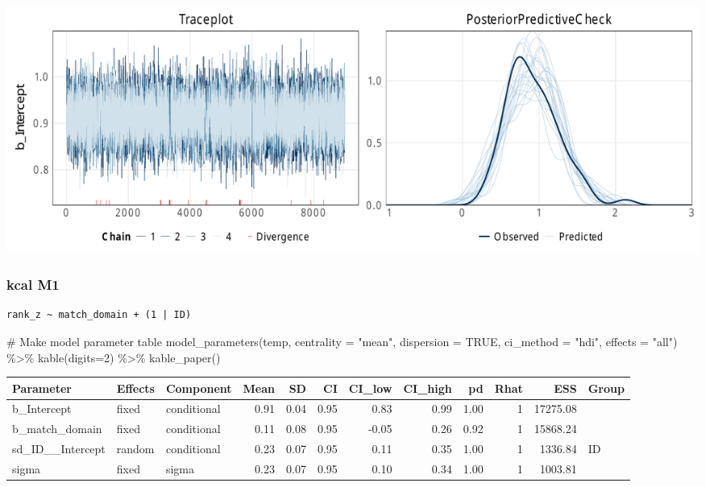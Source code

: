 \documentclass[
  letterpaper,
  DIV=11,
  numbers=noendperiod]{scrartcl}
\newenvironment{Shaded}{\begin{snugshade}}{\end{snugshade}}
\newcommand{\AttributeTok}[1]{\textcolor[rgb]{0.40,0.45,0.13}{#1}}
\newcommand{\CommentTok}[1]{\textcolor[rgb]{0.37,0.37,0.37}{#1}}
\newcommand{\ConstantTok}[1]{\textcolor[rgb]{0.56,0.35,0.01}{#1}}
\newcommand{\DecValTok}[1]{\textcolor[rgb]{0.68,0.00,0.00}{#1}}
\newcommand{\FunctionTok}[1]{\textcolor[rgb]{0.28,0.35,0.67}{#1}}
\newcommand{\NormalTok}[1]{\textcolor[rgb]{0.00,0.23,0.31}{#1}}
\newcommand{\OtherTok}[1]{\textcolor[rgb]{0.00,0.23,0.31}{#1}}
\newcommand{\SpecialCharTok}[1]{\textcolor[rgb]{0.37,0.37,0.37}{#1}}
\newcommand{\StringTok}[1]{\textcolor[rgb]{0.13,0.47,0.30}{#1}}
\begin{document}
\includegraphics{supplement_files/figure-pdf/h1bM0kcal-1.pdf}

\subsubsection{kcal M1}\label{kcal-m1-1}

\begin{Shaded}
\end{Shaded}

\begin{verbatim}
rank_z ~ match_domain + (1 | ID) 
\end{verbatim}

\begin{Shaded}
\begin{Highlighting}[]
\CommentTok{\# Make model parameter table}
\FunctionTok{model\_parameters}\NormalTok{(temp, }\AttributeTok{centrality =} \StringTok{"mean"}\NormalTok{, }\AttributeTok{dispersion =} \ConstantTok{TRUE}\NormalTok{, }
                 \AttributeTok{ci\_method =} \StringTok{"hdi"}\NormalTok{, }\AttributeTok{effects =} \StringTok{"all"}\NormalTok{) }\SpecialCharTok{\%\textgreater{}\%} 
  \FunctionTok{kable}\NormalTok{(}\AttributeTok{digits=}\DecValTok{2}\NormalTok{) }\SpecialCharTok{\%\textgreater{}\%} \FunctionTok{kable\_paper}\NormalTok{()}
\end{Highlighting}
\end{Shaded}

\begin{longtable*}[t]{lllrrrrrrrrl}
\toprule
Parameter & Effects & Component & Mean & SD & CI & CI\_low & CI\_high & pd & Rhat & ESS & Group\\
\midrule
b\_Intercept & fixed & conditional & 0.91 & 0.04 & 0.95 & 0.83 & 0.99 & 1.00 & 1 & 17275.08 & \\
b\_match\_domain & fixed & conditional & 0.11 & 0.08 & 0.95 & -0.05 & 0.26 & 0.92 & 1 & 15868.24 & \\
sd\_ID\_\_Intercept & random & conditional & 0.23 & 0.07 & 0.95 & 0.11 & 0.35 & 1.00 & 1 & 1336.84 & ID\\
sigma & fixed & sigma & 0.23 & 0.07 & 0.95 & 0.10 & 0.34 & 1.00 & 1 & 1003.81 & \\
\bottomrule
\end{longtable*}
\end{document}
